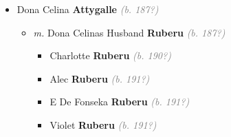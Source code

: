 \documentclass[10pt, openany]{book}
\begin{document}
\begin{itemize}
{\begin{itemize}
{\begin{itemize}
{\begin{itemize}
{\begin{itemize}
{\begin{itemize}
\item{PLAsoka \textbf{Seneviratne} \textcolor{gray}{\textit{(b. 194?)}}
 }
\item{Rukman \textbf{Seneviratne} \textcolor{gray}{\textit{(b. 194?)}}
 }
\end{itemize}}
\end{itemize}
 }
\item{Linton Bernard \textbf{Seneviratne} \textcolor{gray}{\textit{(b. 190?)}}
  }
\item{Peter James \textbf{Seneviratne} \textcolor{gray}{\textit{(b. 191?)}}
\begin{itemize}
\item{\textit{m.} Elsie \textbf{Welikala} \textcolor{gray}{\textit{(b. 191?)}}   \label{couple:00000832:00000957} \begin{itemize}
\item{DamayanthiSeneviratne \textbf{Seneviratne} \textcolor{gray}{\textit{(b. 194?)}}
 }
\end{itemize}}
\end{itemize}
  }
\end{itemize}}
\end{itemize}
   }
\item{Dona Celina \textbf{Attygalle} \textcolor{gray}{\textit{(b. 187?)}}
\begin{itemize}
\item{\textit{m.} Dona Celinas Husband \textbf{Ruberu} \textcolor{gray}{\textit{(b. 187?)}}   \label{couple:00000102:00000668} \begin{itemize}
\item{Charlotte \textbf{Ruberu} \textcolor{gray}{\textit{(b. 190?)}}
 }
\item{Alec \textbf{Ruberu} \textcolor{gray}{\textit{(b. 191?)}}
 }
\item{E De Fonseka \textbf{Ruberu} \textcolor{gray}{\textit{(b. 191?)}}
   }
\item{Violet \textbf{Ruberu} \textcolor{gray}{\textit{(b. 191?)}}
 }
\end{itemize}}
\end{itemize}
  }

\end{itemize}}
\end{itemize}
\end{document}
